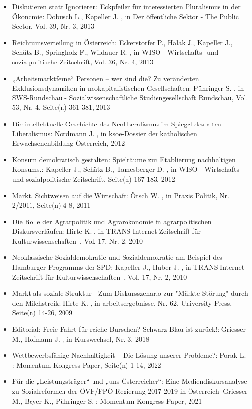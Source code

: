 \begin{itemize}
\item Diskutieren statt Ignorieren: Eckpfeiler für interessierten Pluralismus in der Ökonomie: Dobusch L., Kapeller J. , in Der öffentliche Sektor - The Public Sector, Vol. 39, Nr. 3, 2013
\item Reichtumsverteilung in Österreich: Eckerstorfer P., Halak J., Kapeller J., Schütz B., Springholz F., Wildauer R. , in WISO - Wirtschafts- und sozialpolitische Zeitschrift, Vol. 36, Nr. 4, 2013
\item „Arbeitsmarktferne“ Personen – wer sind die? Zu veränderten Exklusionsdynamiken in neokapitalistischen Gesellschaften: Pühringer S. , in SWS-Rundschau - Sozialwissenschaftliche Studiengesellschaft Rundschau, Vol. 53, Nr. 4, Seite(n) 361-381, 2013
\item Die intellektuelle Geschichte des Neoliberalismus im Spiegel des alten Liberalismus: Nordmann J. , in ksoe-Dossier der katholischen Erwachsenenbildung Österreich, 2012
\item Konsum demokratisch gestalten: Spielräume zur Etablierung nachhaltigen Konsums.: Kapeller J., Schütz B., Tamesberger D. , in WISO - Wirtschafts- und sozialpolitische Zeitschrift, Seite(n) 167-183, 2012
\item Markt. Sichtweisen auf die Wirtschaft: Ötsch W. , in Praxis Politik, Nr. 2/2011, Seite(n) 4-8, 2011
\item Die Rolle der Agrarpolitik und Agrarökonomie in agrarpolitischen Diskursverläufen: Hirte K. , in TRANS Internet-Zeitschrift für Kulturwissenschaften , Vol. 17, Nr. 2, 2010
\item Neoklassische Sozialdemokratie und Sozialdemokratie am Beispiel des Hamburger Programms der SPD: Kapeller J., Huber J. , in TRANS Internet-Zeitschrift für Kulturwissenschaften , Vol. 17, Nr. 2, 2010
\item Markt als soziale Struktur - Zum Diskursszenario zur "Märkte-Störung" durch den Milchstreik: Hirte K. , in arbeitsergebnisse, Nr. 62, University Press, Seite(n) 14-26, 2009
\item Editorial: Freie Fahrt für reiche Burschen? Schwarz-Blau ist zurück!: Griesser M., Hofmann J. , in Kurswechsel, Nr. 3, 2018
\item Wettbewerbsfähige Nachhaltigkeit – Die Lösung unserer Probleme?: Porak L. : Momentum Kongress Paper, Seite(n) 1-14, 2022
\item Für die „Leistungsträger“ und „uns Österreicher“: Eine Mediendiskursanalyse zu Sozialreformen der ÖVP/FPÖ-Regierung 2017-2019 in Österreich: Griesser M., Beyer K., Pühringer S. : Momentum Kongress Paper, 2021

\end{itemize}
